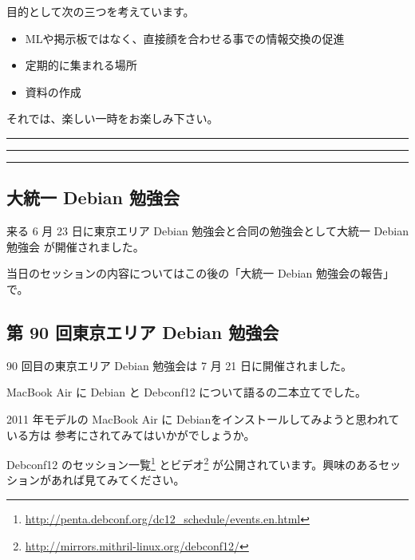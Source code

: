\documentclass[mingoth,a4paper]{jsarticle}
\begin{document}
 目的として次の三つを考えています。
 \begin{itemize}
  \item MLや掲示板ではなく、直接顔を合わせる事での情報交換の促進
  \item 定期的に集まれる場所
  \item 資料の作成
 \end{itemize}

 それでは、楽しい一時をお楽しみ下さい。

\newpage

\begin{minipage}[b]{0.2\hsize}
 {}
\end{minipage}
\begin{minipage}[b]{0.8\hsize}
\hrule
\vspace{2mm}
\hrule
\setcounter{tocdepth}{1}
\tableofcontents
\vspace{2mm}
\hrule
\end{minipage}


\subsection{大統一 Debian 勉強会}
来る 6 月 23 日に東京エリア Debian 勉強会と合同の勉強会として大統一 Debian 勉強会
が開催されました。

当日のセッションの内容についてはこの後の「大統一 Debian 勉強会の報告」で。


\subsection{第 90 回東京エリア Debian 勉強会}
90 回目の東京エリア Debian 勉強会は 7 月 21 日に開催されました。

MacBook Air に Debian と Debconf12 について語るの二本立てでした。

2011 年モデルの MacBook Air に Debianをインストールしてみようと思われている方は
参考にされてみてはいかがでしょうか。

Debconf12 のセッション一覧\footnote{\url{http://penta.debconf.org/dc12_schedule/events.en.html}}
とビデオ\footnote{\url{http://mirrors.mithril-linux.org/debconf12/}}
が公開されています。興味のあるセッションがあれば見てみてください。

\clearpage

\clearpage

\end{document}
